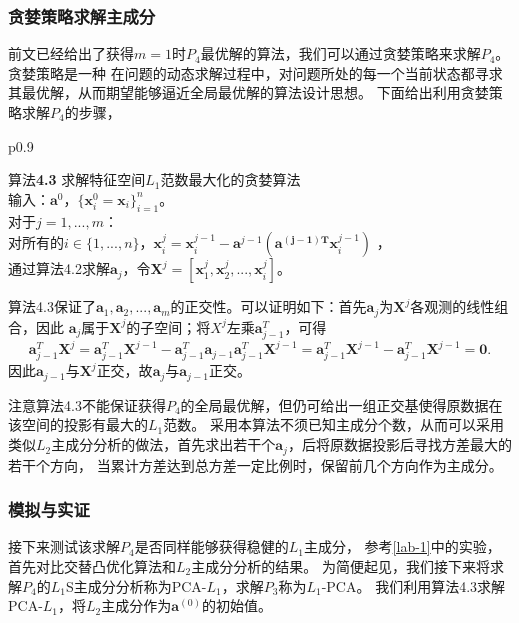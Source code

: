 \subsubsection{贪婪策略求解主成分}
前文已经给出了获得$m = 1$时$P_4$最优解的算法，我们可以通过贪婪策略来求解$P_4$。贪婪策略是一种
在问题的动态求解过程中，对问题所处的每一个当前状态都寻求其最优解，从而期望能够逼近全局最优解的算法设计思想。
下面给出利用贪婪策略求解$P_4$的步骤，
\begin{table}[H]%
    \centering%
    \begin{tabular}{{p{0.9\columnwidth}}}%
    
    \toprule%
    {\heiti 算法}{\bf 4.3} 求解特征空间$L_1$范数最大化的贪婪算法\\
    \midrule%
        输入：$\bm a^0$，$\{\bm x_i^0 = \bm x_i\}_{i=1}^n$。\\
        对于$j = 1, ..., m$： \\
        对所有的$i \in \{ 1, ..., n\}$，$\bm x_i^j = \bm x_i^{j-1} - \bm a^{j-1}(\bm {a^{(j-1)T}}\bm x_i^{j-1})$ ， \\
        通过算法4.2求解$\bm a_j$，令$\bm{X}^j = [\bm x_1^j, \bm x_2^j, ..., \bm x_i^j]$。 \\
    \bottomrule%
    \end{tabular}
\end{table}%
算法4.3保证了$\bm a_1, \bm a_2, ..., \bm a_m$的正交性。可以证明如下：首先$\bm a_j$为$\bm X^j$各观测的线性组合，因此
$\bm a_j$属于$\bm X^j$的子空间；将$X^j$左乘$\bm a_{j-1}^T$，可得
\begin{equation*}
    \bm a_{j-1}^T\bm X^j = \bm a_{j-1}^T \bm X^{j-1} - \bm a_{j-1}^T\bm a_{j-1}\bm a_{j-1}^T \bm X^{j-1}
    = \bm a_{j-1}^T\bm X^{j-1} - \bm a_{j-1}^T\bm X^{j-1} = \bm 0.
\end{equation*}
因此$\bm a_{j-1}$与$\bm X^j$正交，故$\bm a_j$与$\bm a_{j-1}$正交。

注意算法4.3不能保证获得$P_4$的全局最优解，但仍可给出一组正交基使得原数据在该空间的投影有最大的$L_1$范数。
采用本算法不须已知主成分个数，从而可以采用类似$L_2$主成分分析的做法，首先求出若干个$\bm a_j$，后将原数据投影后寻找方差最大的若干个方向，
当累计方差达到总方差一定比例时，保留前几个方向作为主成分。

\subsubsection{模拟与实证}
接下来测试该求解$P_4$是否同样能够获得稳健的$L_1$主成分，
参考\ref{lab-1}中的实验，首先对比交替凸优化算法和$L_2$主成分分析的结果。
为简便起见，我们接下来将求解$P_4$的$L_1$S主成分分析称为PCA-$L_1$，求解$P_3$称为$L_1$-PCA。
我们利用算法4.3求解PCA-$L_1$，将$L_2$主成分作为$\bm a^{(0)}$的初始值。

